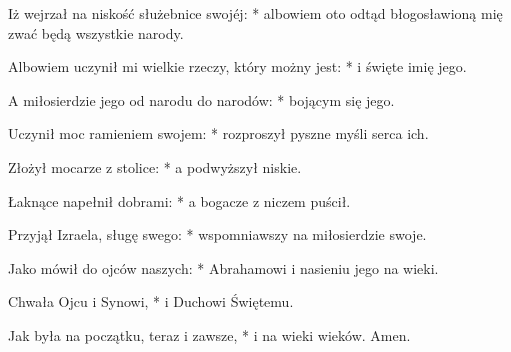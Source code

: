 ﻿\setcounter{enumi}{2}
\item Iż wejrzał na niskość służebnice swojéj: * albowiem oto odtąd błogosławioną mię zwać będą wszystkie narody.
\item Albowiem uczynił mi wielkie rzeczy, który możny jest: * i święte imię jego.
\item A miłosierdzie jego od narodu do narodów: * bojącym się jego.
\item Uczynił moc ramieniem swojem: * rozproszył pyszne myśli serca ich.
\item Złożył mocarze z stolice: * a podwyższył niskie.
\item Łaknące napełnił dobrami: * a bogacze z niczem puścił.
\item Przyjął Izraela, sługę swego: * wspomniawszy na miłosierdzie swoje.
\item Jako mówił do ojców naszych: * Abrahamowi i nasieniu jego na wieki.
\item Chwała Ojcu i Synowi, * i Duchowi Świętemu.
\item Jak była na początku, teraz i zawsze, * i na wieki wieków. Amen.